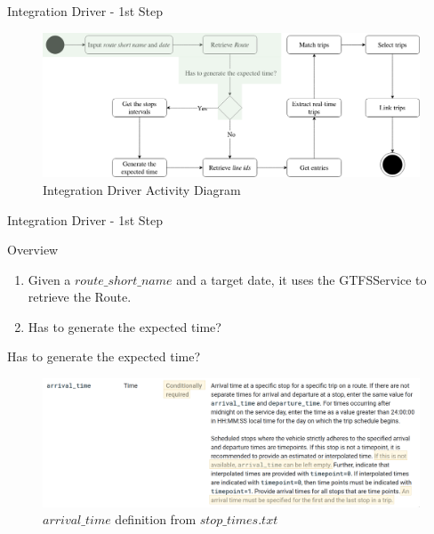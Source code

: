 \documentclass[xcolor=dvipsnames,table]{beamer}
\begin{document}
\begin{frame}{Integration Driver - 1st Step}
        \begin{figure}[H]
                \centering
                \includegraphics[width = \textwidth]{images/integrationDriverAD(1st_step).png}
                \caption{Integration Driver Activity Diagram}
        \end{figure}
\end{frame}
\begin{frame}{Integration Driver - 1st Step}
        \begin{block}{Overview}
                \begin{enumerate}
                        \item  Given a $route\_short\_name$ and a target date, it uses the GTFSService to retrieve the Route.
                        \item Has to generate the expected time?
                \end{enumerate}
        \end{block}
\end{frame}
\begin{frame}{Has to generate the expected time?}
        \begin{figure}[H]
                \centering
                \includegraphics[width = \textwidth]{images/arrival_time_def.png}
                \caption{$arrival\_time$ definition from $stop\_times.txt$}
        \end{figure}
\end{frame}
\end{document}
